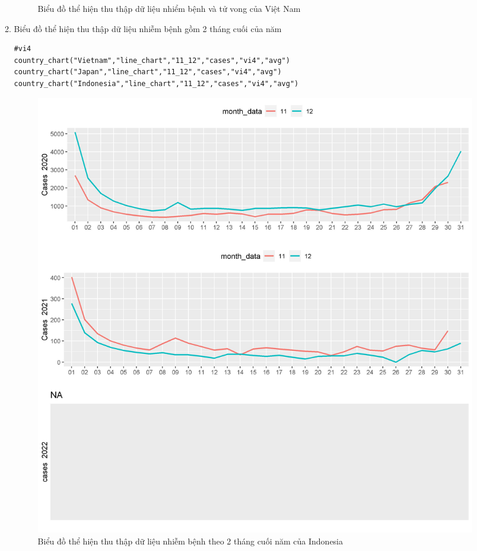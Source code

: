 \documentclass[a4paper]{article}
\theoremstyle{definition}
\begin{document}
\begin{enumerate}[i)]
\begin{enumerate}[1)]
\begin{figure}[htp]
		    \caption{Biểu đồ thể hiện thu thập dữ liệu nhiểm bệnh và tử vong của Việt Nam}
		    \label{fig:my_label}
		 \end{figure}
		 \newpage
    \item Biểu đồ thể hiện thu thập dữ liệu nhiễm bệnh gồm 2 tháng cuối của năm
    \begin{lstlisting}[frame=single]  
#vi4
country_chart("Vietnam","line_chart","11_12","cases","vi4","avg")
country_chart("Japan","line_chart","11_12","cases","vi4","avg")
country_chart("Indonesia","line_chart","11_12","cases","vi4","avg")
		\end{lstlisting}
		\begin{figure}[htp]
		    \centering
		    \includegraphics[scale = 0.7]{Images/VI/vi4 Indonesia .jpeg}
		    \caption{Biểu đồ thể hiện thu thập dữ liệu nhiễm bệnh theo 2 tháng cuối năm của Indonesia}
		    \label{fig:my_label}
		\end{figure}
		\begin{figure}[htp]
		    \centering

\end{figure}
\end{enumerate}
\end{enumerate}
\end{document}
